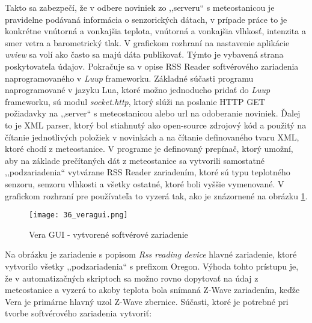 Takto sa zabezpečí, že v odbere noviniek zo ,,serveru`` s meteostanicou je pravidelne podávaná informácia o senzorických dátach, v prípade práce to je konkrétne vnútorná a vonkajšia teplota, vnútorná a vonkajšia vlhkosť, intenzita a smer vetra a barometrický tlak. V grafickom rozhraní na nastavenie aplikácie \textit{wview} sa volí ako často sa majú dáta publikovať. Týmto je vybavená  strana poskytovateľa údajov. Pokračuje sa v opise RSS Reader softvérového zariadenia naprogramovaného v \textit{Luup} frameworku. Základné súčasti programu naprogramované v jazyku Lua, ktoré možno jednoducho pridať do \textit{Luup} frameworku, sú  modul \textit{socket.http}, ktorý slúži na poslanie HTTP GET požiadavky na ,,server`` s meteostanicou alebo url na odoberanie noviniek. Ďalej to je XML parser, ktorý bol stiahnutý ako open-source zdrojový kód a použitý na čítanie jednotlivých položiek v novinkách a na čítanie definovaného tvaru XML, ktoré chodí z meteostanice. V programe je definovaný prepínač, ktorý umožní, aby na základe prečítaných dát z meteostanice sa vytvorili samostatné ,,podzariadenia`` vytvárane RSS Reader zariadením, ktoré sú typu teplotného senzoru, senzoru vlhkosti a všetky ostatné, ktoré boli vyššie vymenované. V grafickom rozhraní pre používateľa to vyzerá tak, ako je znázornené na obrázku \ref{36_veragui}. 
\begin{figure}[!htbp]
\centering
\texttt{[image: 36\_veragui.png]}
\caption{Vera GUI - vytvorené softvérové zariadenie}
\label{36_veragui}
\end{figure} 
Na obrázku je zariadenie s popisom \textit{Rss reading device} hlavné zariadenie, ktoré vytvorilo všetky ,,podzariadenia`` s prefixom Oregon. Výhoda tohto prístupu je, že v automatizačných skriptoch sa možno rovno dopytovať na údaj z meteostanice a vyzerá to akoby teplota bola snímaná Z-Wave zariadením, keďže Vera je primárne hlavný uzol Z-Wave zbernice. Súčasti, ktoré je potrebné pri tvorbe softvérového zariadenia vytvoriť:
